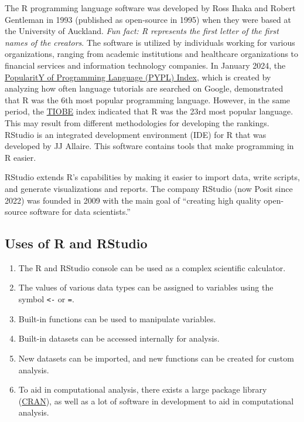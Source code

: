 \documentclass[
  letterpaper,
  DIV=11,
  numbers=noendperiod]{scrreprt}
\begin{document}
The R programming language software was developed by Ross Ihaka and
Robert Gentleman in 1993 (published as open-source in 1995) when they
were based at the University of Auckland. \emph{Fun fact: R represents
the first letter of the first names of the creators}. The software is
utilized by individuals working for various organizations, ranging from
academic institutions and healthcare organizations to financial services
and information technology companies. In January 2024, the
\href{https://pypl.github.io/PYPL.html}{PopularitY of Programming
Language (PYPL) Index}, which is created by analyzing how often language
tutorials are searched on Google, demonstrated that R was the 6th most
popular programming language. However, in the same period, the
\href{https://www.tiobe.com/tiobe-index/}{TIOBE} index indicated that R
was the 23rd most popular language. This may result from different
methodologies for developing the rankings. RStudio is an integrated
development environment (IDE) for R that was developed by JJ Allaire.
This software contains tools that make programming in R easier.

RStudio extends R's capabilities by making it easier to import data,
write scripts, and generate visualizations and reports. The company
RStudio (now Posit since 2022) was founded in 2009 with the main goal of
``creating high quality open-source software for data scientists.''

\subsection{Uses of R and RStudio}\label{uses-of-r-and-rstudio}

\begin{enumerate}
\def\labelenumi{\roman{enumi}.}
\item
  The R and RStudio console can be used as a complex scientific
  calculator.
\item
  The values of various data types can be assigned to variables using
  the symbol \texttt{\textless{}-} or \texttt{=}.
\item
  Built-in functions can be used to manipulate variables.
\item
  Built-in datasets can be accessed internally for analysis.
\item
  New datasets can be imported, and new functions can be created for
  custom analysis.
\item
  To aid in computational analysis, there exists a large package library
  (\href{https://cran.r-project.org/}{CRAN}), as well as a lot of
  software in development to aid in computational analysis.
\end{enumerate}
\end{document}
